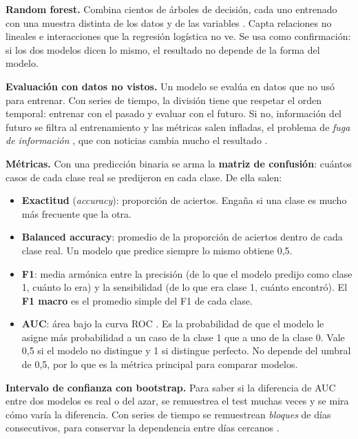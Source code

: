 \textbf{Random forest.} Combina cientos de árboles de decisión, cada uno entrenado con una muestra
distinta de los datos y de las variables \citep{breiman2001}. Capta relaciones no lineales e
interacciones que la regresión logística no ve. Se usa como confirmación: si los dos modelos dicen
lo mismo, el resultado no depende de la forma del modelo.

\textbf{Evaluación con datos no vistos.} Un modelo se evalúa en datos que no usó para entrenar. Con
series de tiempo, la división tiene que respetar el orden temporal: entrenar con el pasado y
evaluar con el futuro. Si no, información del futuro se filtra al entrenamiento y las métricas
salen infladas, el problema de \textit{fuga de información} \citep{kapoor2023leakage}, que con
noticias cambia mucho el resultado \citep{xue2026temporal}.

\textbf{Métricas.} Con una predicción binaria se arma la \textbf{matriz de confusión}: cuántos
casos de cada clase real se predijeron en cada clase. De ella salen:
\begin{itemize}
  \item \textbf{Exactitud} (\textit{accuracy}): proporción de aciertos. Engaña si una clase es mucho
        más frecuente que la otra.
  \item \textbf{Balanced accuracy}: promedio de la proporción de aciertos dentro de cada clase real.
        Un modelo que predice siempre lo mismo obtiene 0,5.
  \item \textbf{F1}: media armónica entre la precisión (de lo que el modelo predijo como clase 1,
        cuánto lo era) y la sensibilidad (de lo que era clase 1, cuánto encontró). El
        \textbf{F1 macro} es el promedio simple del F1 de cada clase.
  \item \textbf{AUC}: área bajo la curva ROC \citep{fawcett2006}. Es la probabilidad de que el
        modelo le asigne más probabilidad a un caso de la clase 1 que a uno de la clase 0. Vale 0,5
        si el modelo no distingue y 1 si distingue perfecto. No depende del umbral de 0,5, por lo
        que es la métrica principal para comparar modelos.
\end{itemize}

\textbf{Intervalo de confianza con bootstrap.} Para saber si la diferencia de AUC entre dos modelos
es real o del azar, se remuestrea el test muchas veces y se mira cómo varía la diferencia. Con
series de tiempo se remuestrean \textit{bloques} de días consecutivos, para conservar la
dependencia entre días cercanos \citep{kunsch1989}.

